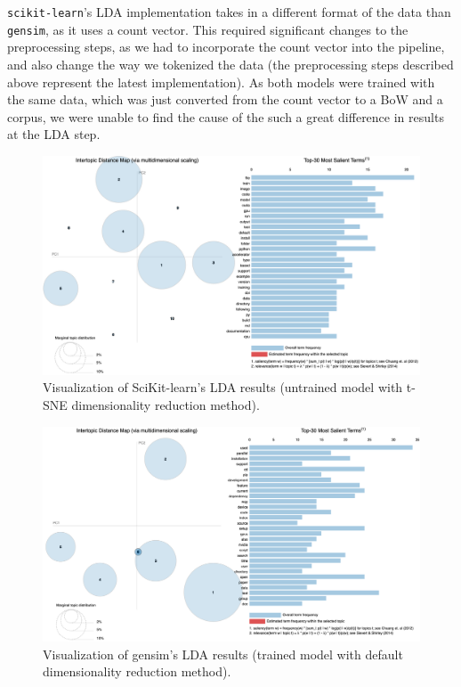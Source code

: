 \documentclass[11pt, conference, onecolumn, final]{IEEEtran}
\begin{document}
\verb|scikit-learn|'s LDA implementation takes in a different format of the
data than \verb|gensim|, as it uses a count vector.
This required significant changes to the preprocessing steps, as we had to
incorporate the count vector into the pipeline, and also change the way we
tokenized the data (the preprocessing steps described above represent the
latest implementation).
As both models were trained with the same data, which was just converted from
the count vector to a BoW and a corpus, we were unable to find the cause of the
such a great difference in results at the LDA step.

\begin{figure}[H]
    \centering
    \includegraphics[width=0.95\linewidth]{sklearn-default.png}
    \caption{Visualization of SciKit-learn's LDA results (untrained model with
        t-SNE dimensionality reduction method).}
    \label{fig:lda_sklearn_untrained_mds}
\end{figure}

\begin{figure}[H]
    \centering
    \includegraphics[width=0.95\linewidth]{gensim.png}
    \caption{Visualization of gensim's LDA results (trained model with default
        dimensionality reduction method).}
    \label{fig:lda_gensim}
\end{figure}
\end{document}
